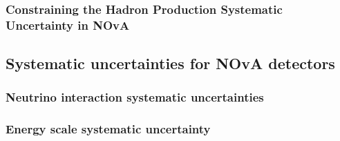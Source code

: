 \subsubsection{Constraining the Hadron Production Systematic Uncertainty in NOvA}

\subsection{Systematic uncertainties for NOvA detectors}

\subsubsection{Neutrino interaction systematic uncertainties}

\subsubsection{Energy scale systematic uncertainty}


